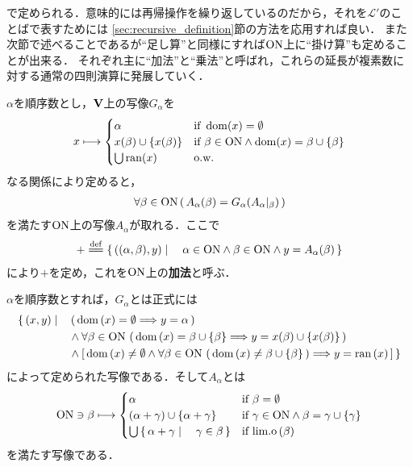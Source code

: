 	で定められる．意味的には再帰操作を繰り返しているのだから，それを$\mathcal{L}'$のことばで表すためには
	\ref{sec:recursive_definition}節の方法を応用すれば良い．
	また次節で述べることであるが``足し算''と同様にすれば$\mathrm{ON}$上に``掛け算''も定めることが出来る．
	それぞれ主に``加法''と``乗法''と呼ばれ，これらの延長が複素数に対する通常の四則演算に発展していく．
	
	\begin{screen}
		\begin{dfn}[順序数の加法]
			$\alpha$を順序数とし，$\mathbf{V}$上の写像$G_\alpha$を
			\begin{align}
				x \longmapsto 
				\begin{cases}
					\alpha & \mbox{if } \operatorname{dom}(x) = \emptyset \\
					x(\beta) \cup \{x(\beta)\} & \mbox{if } \beta \in \mathrm{ON} \wedge \operatorname{dom}(x) = \beta \cup \{\beta\} \\
					\bigcup \operatorname{ran}(x) & \mbox{o.w.}
				\end{cases}
			\end{align}
			なる関係により定めると，
			\begin{align}
				\forall \beta \in \mathrm{ON}\, (\, A_\alpha(\beta) = G_\alpha(A_\alpha|_\beta)\, )
			\end{align}
			を満たす$\mathrm{ON}$上の写像$A_\alpha$が取れる．ここで
			\begin{align}
				+ \defeq \Set{((\alpha,\beta),y)}{\alpha \in \ON \wedge \beta \in \ON \wedge y = A_\alpha (\beta)}
			\end{align}
			により$+$を定め，これを$\mathrm{ON}$上の{\bf 加法}と呼ぶ．
		\end{dfn}
	\end{screen}
	
	$\alpha$を順序数とすれば，$G_\alpha$とは正式には
	\begin{align}
		\{\, (x,y) \mid \quad &\left(\, \operatorname*{dom} \left(x\right) = \emptyset \Longrightarrow y = \alpha\, \right) \\
		&\wedge \forall \beta \in \mathrm{ON}\, \left(\, \operatorname*{dom} \left(x\right) = \beta \cup \{\beta\} \Longrightarrow y = x(\beta) \cup \{x(\beta)\}\, \right) \\
		&\wedge \left[\, \operatorname*{dom} \left(x\right) \neq \emptyset \wedge \forall \beta \in \mathrm{ON}\, \left(\, \operatorname*{dom} \left(x\right) \neq \beta \cup \{\beta\}\, \right)
		\Longrightarrow y = \operatorname*{ran} \left(x\right)\, \right]\, \}
	\end{align}
	によって定められた写像である．そして$A_\alpha$とは
	\begin{align}
		\mathrm{ON} \ni \beta \longmapsto
		\begin{cases}
			\alpha & \mbox{if } \beta = \emptyset \\
			(\alpha + \gamma) \cup \{\alpha + \gamma\} & \mbox{if } \gamma \in \mathrm{ON} \wedge \beta = \gamma \cup \{\gamma\} \\
			\bigcup \left\{\, \alpha + \gamma \mid \quad \gamma \in \beta\, \right\} & \mbox{if } \mathrm{lim.o}\left(\beta\right)
		\end{cases}
	\end{align}
	を満たす写像である．
	
